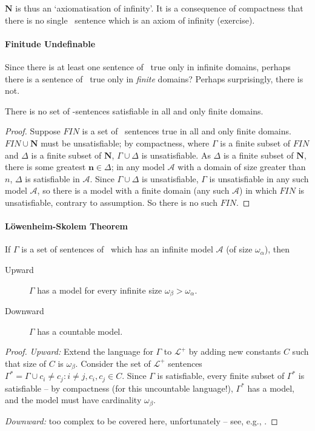 $\mathbf{N}$ is thus an `axiomatisation of infinity'. It is a consequence of compactness that there is no single \lequ\ sentence which is an axiom of infinity (exercise).




\paragraph{Finitude Undefinable}

Since there is at least one sentence of \lequ\ true only in infinite domains, perhaps there is a sentence of \lequ\ true only in \emph{finite} domains? Perhaps surprisingly, there is not.\begin{theorem}
There is no set of \lequ-sentences satisfiable in all and only finite domains. \begin{proof}
	{Suppose $FIN$ is a set of \lequ\ sentences true in all and only finite domains. $FIN \cup \mathbf{N}$ must be unsatisfiable; by compactness, where $\Gamma$ is a finite subset of $FIN$ and $\Delta$ is a finite subset of $\mathbf{N}$, $\Gamma \cup \Delta$ is unsatisfiable. As $\Delta$ is a finite subset of $\mathbf{N}$, there is some greatest $\mathbf{n}\in\Delta$; in any model $\mathscr{A}$ with a domain of size greater than $n$, $\Delta$ is satisfiable in $\mathscr{A}$. Since $\Gamma\cup\Delta$ is unsatisfiable, $\Gamma$ is unsatisfiable in any such model $\mathscr{A}$, so there is a model with a finite domain (any such $\mathscr{A}$) in which $FIN$ is unsatisfiable, contrary to assumption. So there is no such $FIN$.}\end{proof}\end{theorem}


\paragraph{L\"owenheim-Skolem Theorem}

\begin{theorem}
	If $\Gamma$ is a set of sentences of \lequ\ which has an infinite model $\mathscr{A}$ (of size $\omega_{\alpha}$), then \begin{description}
			\item [Upward] $\Gamma$ has a model for every infinite size $\omega_{\beta} > \omega_{\alpha}$.
			\item [Downward] $\Gamma$ has a countable model.
	\end{description} \begin{proof}
		{\emph{Upward:} Extend the language for $\Gamma$ to $\mathcal{L}^{+}$ by adding new constants $C$ such that size of $C$ is $\omega_{\beta}$.  Consider the set of $\mathcal{L}^{+}$ sentences $\Gamma^{*} = \Gamma \cup {c_{i}\neq c_{j}: i\neq j, c_{i},c_{j}\in C}$. Since $\Gamma$ is satisfiable, every finite subset of $\Gamma^{*}$ is satisfiable – by compactness (for this uncountable language!), $\Gamma^{*}$ has a model, and the model must have cardinality $\omega_{\beta}$.
	
		\emph{Downward:} too complex to be covered here, unfortunately – see, e.g., \citet[chs.\ 12--13]{bbjcomlo}.}
			\end{proof}
\end{theorem}


